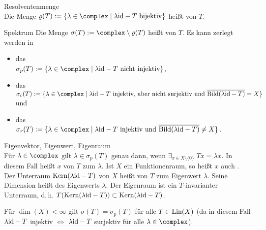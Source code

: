 \begin{Def}{Resolventenmenge}\\
    Die Menge $\varrho(T) := \{\lambda \in \complex \;|\; \lambda\id - T \text{ bijektiv}\}$
    heißt  von $T$.
\end{Def}

\begin{Def}{Spektrum}
    Die Menge $\sigma(T) := \complex \setminus \varrho(T)$
    heißt  von $T$.
    Es kann zerlegt werden in
    \begin{itemize}
        \item
        das \\
        $\sigma_p(T) := \{\lambda \in \complex \;|\; \lambda\id - T \text{ nicht injektiv}\}$,
        
        \item
        das \\
        $\sigma_c(T) := \{\lambda \in \complex \;|\; \lambda\id - T
        \text{ injektiv, aber nicht surjektiv und } \overline{\Bild(\lambda\id - T)} = X\}$ und
        
        \item
        das \\
        $\sigma_r(T) := \{\lambda \in \complex \;|\; \lambda\id - T
        \text{ injektiv und } \overline{\Bild(\lambda\id - T)} \not= X\}$.
    \end{itemize}
\end{Def}

\begin{Def}{Eigenvektor, Eigenwert, Eigenraum}\\
    Für $\lambda \in \complex$ gilt $\lambda \in \sigma_p(T)$ genau dann, wenn
    $\exists_{x \in X \setminus \{0\}}\; Tx = \lambda x$.
    In diesem Fall heißt $x$  von $T$ zum  $\lambda$.
    Ist $X$ ein Funktionenraum, so heißt $x$ auch .
    Der Unterraum $\text{Kern}(\lambda\text{id} - T)$ von $X$ heißt  von $T$ zum
    Eigenwert $\lambda$.
    Seine Dimension heißt  des Eigenwerts $\lambda$.
    Der Eigenraum ist ein $T$-invarianter Unterraum, d.\,h.
    $T(\text{Kern}(\lambda\text{id} - T)) \subset \text{Kern}(\lambda\text{id} - T)$.
\end{Def}

\begin{Bem}
    Für $\dim(X) < \infty$ gilt $\sigma(T) = \sigma_p(T)$ für alle $T \in \operatorname{Lin}(X)$
    (da in diesem Fall $\lambda\text{id} - T$ injektiv $\iff$ $\lambda\text{id} - T$ surjektiv für alle
    $\lambda \in \complex$).
\end{Bem}

